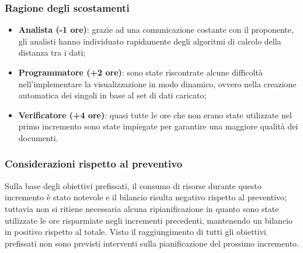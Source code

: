 \subsubsection{Ragione degli scostamenti}

\begin{itemize}
\item \textbf{Analista (-1 ore)}: grazie ad una comunicazione costante con il proponente, gli analisti hanno individuato rapidamente degli algoritmi di calcolo della distanza tra i dati;

\item \textbf{Programmatore (+2 ore)}: sono state riscontrate alcune difficoltà nell'implementare la visualizzazione  in modo dinamico, ovvero nella creazione automatica dei singoli  in base al set di dati caricato;

\item \textbf{Verificatore (+4 ore)}: quasi tutte le ore che non erano state utilizzate nel primo incremento sono state impiegate per garantire una maggiore qualità dei documenti.
\end{itemize}
\subsubsection{Considerazioni rispetto al preventivo}

Sulla base degli obiettivi prefissati, il consumo di risorse durante questo incremento è stato notevole e il bilancio risulta negativo rispetto al preventivo; tuttavia non si ritiene necessaria alcuna ripianificazione in quanto sono state utilizzate le ore risparmiate negli incrementi precedenti, mantenendo un bilancio in positivo rispetto al totale. Visto il raggiungimento di tutti gli obiettivi prefissati non sono previsti interventi sulla pianificazione del prossimo incremento.

\newpage

